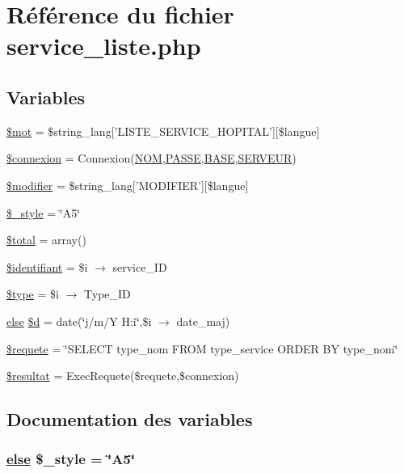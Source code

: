 \hypertarget{service__liste_8php}{
\section{R\'{e}f\'{e}rence du fichier service\_\-liste.php}
\label{service__liste_8php}
}
\subsection*{Variables}
\begin{CompactItemize}
\item 
\hyperlink{service__liste_8php_a0}{\$mot} = \$string\_\-lang\mbox{[}'LISTE\_\-SERVICE\_\-HOPITAL'\mbox{]}\mbox{[}\$langue\mbox{]}
\item 
\hyperlink{service__liste_8php_a1}{\$connexion} = Connexion(\hyperlink{pma__connect_8php_a0}{NOM},\hyperlink{pma__connect_8php_a1}{PASSE},\hyperlink{pma__connect_8php_a3}{BASE},\hyperlink{pma__connect_8php_a2}{SERVEUR})
\item 
\hyperlink{service__liste_8php_a2}{\$modifier} = \$string\_\-lang\mbox{[}'MODIFIER'\mbox{]}\mbox{[}\$langue\mbox{]}
\item 
\hyperlink{service__liste_8php_a3}{\$\_\-style} = \char`\"{}A5\char`\"{}
\item 
\hyperlink{service__liste_8php_a4}{\$total} = array()
\item 
\hyperlink{service__liste_8php_a5}{\$identifiant} = \$i $\rightarrow$ service\_\-ID
\item 
\hyperlink{service__liste_8php_a6}{\$type} = \$i $\rightarrow$ Type\_\-ID
\item 
\hyperlink{cron_8php_a9}{else} \hyperlink{service__liste_8php_a7}{\$d} = date(\char`\"{}j/m/Y H:i\char`\"{},\$i $\rightarrow$ date\_\-maj)
\item 
\hyperlink{service__liste_8php_a8}{\$requete} = \char`\"{}SELECT type\_\-nom FROM type\_\-service ORDER BY type\_\-nom\char`\"{}
\item 
\hyperlink{service__liste_8php_a9}{\$resultat} = Exec\-Requete(\$requete,\$connexion)
\end{CompactItemize}


\subsection{Documentation des variables}
\hypertarget{service__liste_8php_a3}{
\subsubsection[\$\_\-style]{\setlength{\rightskip}{0pt plus 5cm}\hyperlink{cron_8php_a9}{else} \$\_\-style = \char`\"{}A5\char`\"{}}}
\label{service__liste_8php_a3}


